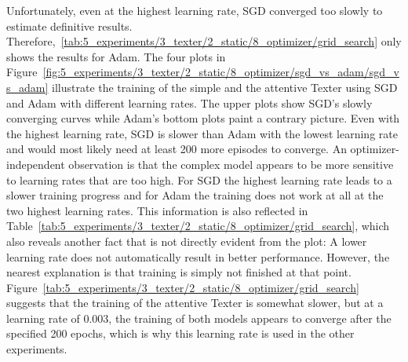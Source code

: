 Unfortunately, even at the highest learning rate, SGD converged too slowly to estimate definitive results. Therefore,~\ref{tab:5_experiments/3_texter/2_static/8_optimizer/grid_search} only shows the results for Adam. The four plots in Figure~\ref{fig:5_experiments/3_texter/2_static/8_optimizer/sgd_vs_adam/sgd_vs_adam} illustrate the training of the simple and the attentive Texter using SGD and Adam with different learning rates. The upper plots show SGD's slowly converging curves while Adam's bottom plots paint a contrary picture. Even with the highest learning rate, SGD is slower than Adam with the lowest learning rate and would most likely need at least 200 more episodes to converge. An optimizer-independent observation is that the complex model appears to be more sensitive to learning rates that are too high. For SGD the highest learning rate leads to a slower training progress and for Adam the training does not work at all at the two highest learning rates. This information is also reflected in Table~\ref{tab:5_experiments/3_texter/2_static/8_optimizer/grid_search}, which also reveals another fact that is not directly evident from the plot: A lower learning rate does not automatically result in better performance. However, the nearest explanation is that training is simply not finished at that point. Figure~\ref{tab:5_experiments/3_texter/2_static/8_optimizer/grid_search} suggests that the training of the attentive Texter is somewhat slower, but at a learning rate of 0.003, the training of both models appears to converge after the specified 200 epochs, which is why this learning rate is used in the other experiments.
